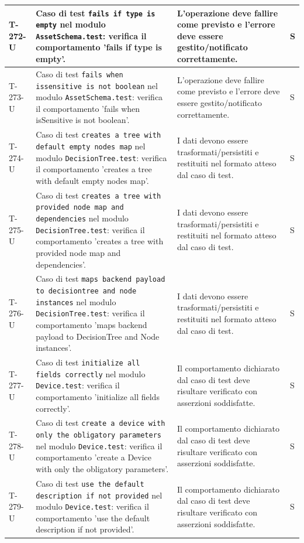 \documentclass[a4paper,12pt]{article}
\begin{document}
{{\begin{longtable}{|>{\RaggedRight\arraybackslash}p{1.55cm}|>{\RaggedRight\arraybackslash}p{8.0cm}|>{\RaggedRight\arraybackslash}p{4.6cm}|>{\RaggedRight\arraybackslash}p{1.2cm}|}
        \hline
        T-272-U & Caso di test \texttt{fails if type is empty} nel modulo \texttt{AssetSchema.test}: verifica il comportamento 'fails if type is empty'. & L'operazione deve fallire come previsto e l'errore deve essere gestito/notificato correttamente. & S \\
        \hline
        T-273-U & Caso di test \texttt{fails when issensitive is not boolean} nel modulo \texttt{AssetSchema.test}: verifica il comportamento 'fails when isSensitive is not boolean'. & L'operazione deve fallire come previsto e l'errore deve essere gestito/notificato correttamente. & S \\
        \hline
        T-274-U & Caso di test \texttt{creates a tree with default empty nodes map} nel modulo \texttt{DecisionTree.test}: verifica il comportamento 'creates a tree with default empty nodes map'. & I dati devono essere trasformati/persistiti e restituiti nel formato atteso dal caso di test. & S \\
        \hline
        T-275-U & Caso di test \texttt{creates a tree with provided node map and dependencies} nel modulo \texttt{DecisionTree.test}: verifica il comportamento 'creates a tree with provided node map and dependencies'. & I dati devono essere trasformati/persistiti e restituiti nel formato atteso dal caso di test. & S \\
        \hline
        T-276-U & Caso di test \texttt{maps backend payload to decisiontree and node instances} nel modulo \texttt{DecisionTree.test}: verifica il comportamento 'maps backend payload to DecisionTree and Node instances'. & I dati devono essere trasformati/persistiti e restituiti nel formato atteso dal caso di test. & S \\
        \hline
        T-277-U & Caso di test \texttt{initialize all fields correctly} nel modulo \texttt{Device.test}: verifica il comportamento 'initialize all fields correctly'. & Il comportamento dichiarato dal caso di test deve risultare verificato con asserzioni soddisfatte. & S \\
        \hline
        T-278-U & Caso di test \texttt{create a device with only the obligatory parameters} nel modulo \texttt{Device.test}: verifica il comportamento 'create a Device with only the obligatory parameters'. & Il comportamento dichiarato dal caso di test deve risultare verificato con asserzioni soddisfatte. & S \\
        \hline
        T-279-U & Caso di test \texttt{use the default description if not provided} nel modulo \texttt{Device.test}: verifica il comportamento 'use the default description if not provided'. & Il comportamento dichiarato dal caso di test deve risultare verificato con asserzioni soddisfatte. & S \\

\end{longtable}}}
\end{document}
